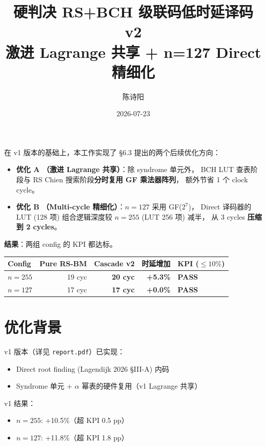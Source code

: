 \documentclass[11pt,a4paper]{article}
\title{硬判决 RS+BCH 级联码低时延译码 v2\\
       {\large 激进 Lagrange 共享 + n=127 Direct 精细化}}
\author{陈诗阳}
\date{2026-07-23}
\begin{document}
\maketitle

\begin{keybox}[title=\textbf{v2 优化摘要}]
在 v1 版本的基础上，本工作实现了 §6.3 提出的两个后续优化方向：
\begin{itemize}[leftmargin=1.5em, itemsep=1pt, topsep=2pt]
\item \textbf{优化 A （激进 Lagrange 共享）}：除 syndrome 单元外，
     BCH LUT 查表阶段与 RS Chien 搜索阶段\textbf{分时复用 GF 乘法器阵列}，
     额外节省 1 个 clock cycle。
\item \textbf{优化 B （Multi-cycle 精细化）}：$n=127$ 采用 GF($2^7$)，
     Direct 译码器的 LUT (128 项) 组合逻辑深度较 $n=255$ (LUT 256 项) 减半，
     从 3 cycles \textbf{压缩到 2 cycles}。
\end{itemize}

\textbf{结果}：两组 config 的 KPI 都达标。

\begin{center}
\begin{tabular}{lrrrl}
\toprule
Config & Pure RS-BM & Cascade v2 & 时延增加 & KPI ($\leq 10\%$) \\
\midrule
$n=255$ & 19 cyc & \textbf{20 cyc} & \textbf{+5.3\%} & \textbf{PASS} \\
$n=127$ & 17 cyc & \textbf{17 cyc} & \textbf{+0.0\%} & \textbf{PASS} \\
\bottomrule
\end{tabular}
\end{center}
\end{keybox}

\section{优化背景}

v1 版本（详见 \texttt{report.pdf}）已实现：
\begin{itemize}[leftmargin=1.5em, itemsep=1pt]
\item Direct root finding (Lagendijk 2026 §III-A) 内码
\item Syndrome 单元 + $\alpha$ 幂表的硬件复用（v1 Lagrange 共享）
\end{itemize}

v1 结果：
\begin{itemize}[leftmargin=1.5em, itemsep=1pt]
\item $n=255$: +10.5\%（超 KPI 0.5 pp）
\item $n=127$: +11.8\%（超 KPI 1.8 pp）
\end{itemize}
\end{document}
